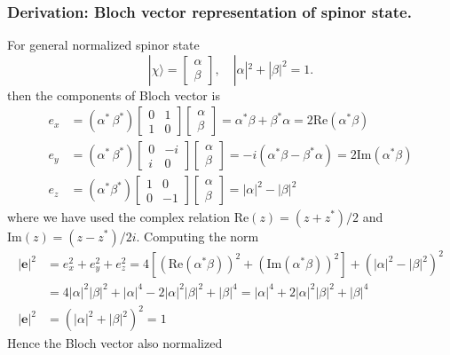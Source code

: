 \documentclass[../../../main.tex]{subfiles}
\begin{document}
\subsubsection{Derivation: Bloch vector representation of spinor state.}
For general normalized spinor state
\begin{equation*}
    |\chi\rangle = \begin{bmatrix} \alpha \\ \beta \end{bmatrix}, \quad |\alpha|^2 + |\beta|^2 = 1.
\end{equation*}
then the components of Bloch vector is
\begin{align*}
    e_x & =  \left( \alpha^* \, \beta^* \right) \begin{bmatrix} 0 & 1 \\ 1 & 0 \end{bmatrix} \begin{bmatrix} \alpha \\ \beta \end{bmatrix} = \alpha^*\beta + \beta^*\alpha = 2\text{Re}(\alpha^*\beta)      \\
    e_y & =  \left( \alpha^* \, \beta^* \right) \begin{bmatrix} 0 & -i \\ i & 0 \end{bmatrix} \begin{bmatrix} \alpha \\ \beta \end{bmatrix} = -i(\alpha^*\beta - \beta^*\alpha) = 2\text{Im}(\alpha^*\beta) \\
    e_z & =  (\alpha^* \beta^*)  \begin{bmatrix} 1 & 0 \\ 0 & -1 \end{bmatrix}  \begin{bmatrix} \alpha \\ \beta \end{bmatrix} = |\alpha|^2 - |\beta|^2
\end{align*}
where we have used the complex relation $\mathrm{Re } (z) = (z + z ^* )/2$ and $\mathrm{Im } (z) = (z - z ^* )/2i$.
Computing the norm
\begin{align*}
    |\mathbf{e}|^2 & =  e_x^2 + e_y^2 + e_z^2 = 4\left[(\mathrm{Re}(\alpha^* \beta))^2 + (\mathrm{Im}(\alpha^* \beta))^2\right] + (|\alpha|^2 - |\beta|^2)^2 \\
                   & =  4|\alpha|^2 |\beta|^2 + |\alpha|^4 - 2|\alpha|^2|\beta|^2 + |\beta|^4 = |\alpha|^4 + 2 |\alpha|^2 |\beta|^2 + |\beta|^4              \\
    |\mathbf{e}|^2
                   & = (|\alpha|^2 + |\beta|^2)^2 = 1
\end{align*}
Hence the Bloch vector also normalized
\end{document}
